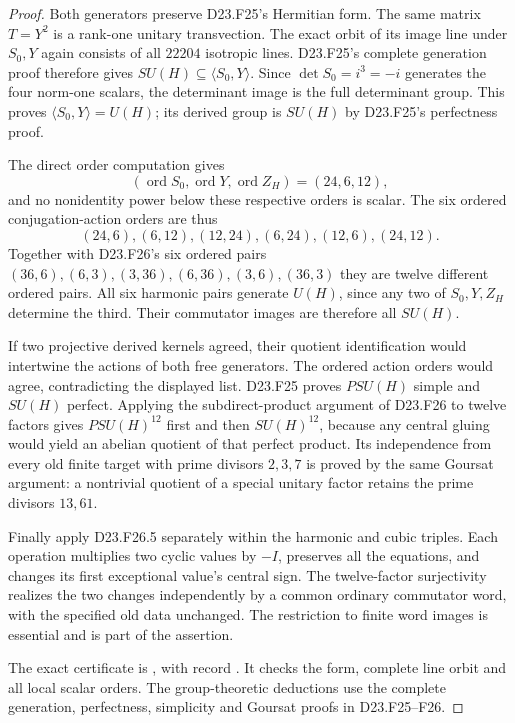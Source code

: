 \begin{proof}
Both generators preserve D23.F25's Hermitian form.  The same
matrix $T=Y^2$ is a rank-one unitary transvection.  The exact
orbit of its image line under $S_0,Y$ again consists of all
$22204$ isotropic lines.  D23.F25's complete generation proof
therefore gives $SU(H)\subseteq\langle S_0,Y\rangle$.
Since $\det S_0=i^3=-i$ generates the four norm-one scalars,
the determinant image is the full determinant group.  This
proves $\langle S_0,Y\rangle=U(H)$; its derived group is
$SU(H)$ by D23.F25's perfectness proof.

The direct order computation gives
\[
 (\operatorname{ord}S_0,\operatorname{ord}Y,
        \operatorname{ord}Z_H)=(24,6,12),
\]
and no nonidentity power below these respective orders is
scalar.  The six ordered conjugation-action orders are thus
\[
       (24,6),(6,12),(12,24),(6,24),(12,6),(24,12).
\]
Together with D23.F26's six ordered pairs
$(36,6),(6,3),(3,36),(6,36),(3,6),(36,3)$ they are twelve
different ordered pairs.  All six harmonic pairs generate
$U(H)$, since any two of $S_0,Y,Z_H$ determine the third.
Their commutator images are therefore all $SU(H)$.

If two projective derived kernels agreed, their quotient
identification would intertwine the actions of both free
generators.  The ordered action orders would agree, contradicting
the displayed list.  D23.F25 proves $PSU(H)$ simple and
$SU(H)$ perfect.  Applying the subdirect-product argument
of D23.F26 to twelve factors gives $PSU(H)^{12}$ first and
then $SU(H)^{12}$, because any central gluing would yield an
abelian quotient of that perfect product.  Its independence
from every old finite target with prime divisors $2,3,7$
is proved by the same Goursat argument: a nontrivial quotient
of a special unitary factor retains the prime divisors $13,61$.

Finally apply D23.F26.5 separately within the harmonic and
cubic triples.  Each operation multiplies two cyclic values
by $-I$, preserves all the equations, and changes its first
exceptional value's central sign.  The twelve-factor
surjectivity realizes the two changes independently by a
common ordinary commutator word, with the specified old data
unchanged.  The restriction to finite word images is essential
and is part of the assertion.

The exact certificate is
,
with record .
It checks the form, complete line orbit and all local scalar
orders.  The group-theoretic deductions use the complete
generation, perfectness, simplicity and Goursat proofs in
D23.F25--F26.
\end{proof}
